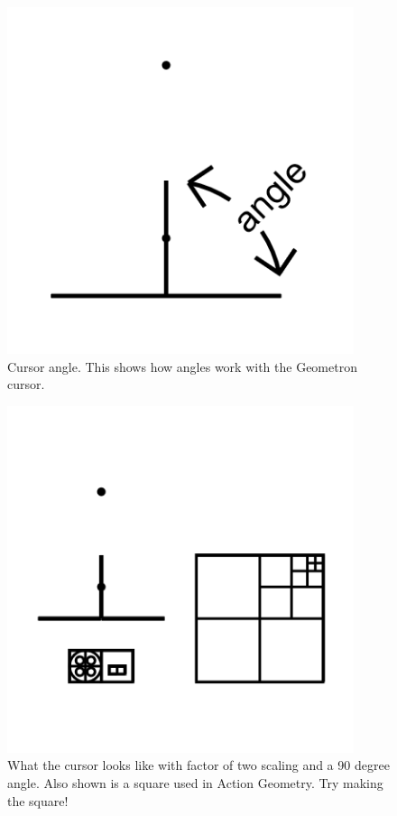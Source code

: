 \begin{figure}
	\centering
	\includegraphics[width=4in]{figures/web2d/cursorangle1.png}
	\caption[cursorangle]
	{Cursor angle. This shows how angles work with the Geometron cursor.}
\end{figure}
\begin{figure}
	\centering
	\includegraphics[width=4in]{figures/web2d/cursorsquare.png}
	\caption[cursorsquare]
	{What the cursor looks like with factor of two scaling and a 90 degree angle.  Also shown is a square used in Action Geometry.  Try making the square!}
\end{figure}
